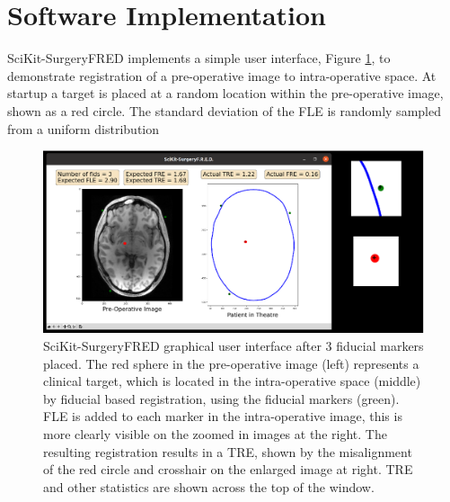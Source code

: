 \section{Software Implementation}
SciKit-SurgeryFRED implements a simple user interface, Figure \ref{fig:surgery_fred}, to demonstrate registration of a pre-operative image to intra-operative space. At startup a target is placed at a random location within the pre-operative image, shown as a red circle. The standard deviation of the \gls{FLE} is randomly sampled from a uniform distribution 

\begin{figure}
	\begin{center}
	\includegraphics[width=0.9\linewidth]{scikit-surgeryfred_gui.eps}
		\caption{\label{fig:surgery_fred}SciKit-SurgeryFRED graphical user interface after 3 fiducial markers placed. The red sphere in the pre-operative image (left) represents a clinical target, which is located in the
		intra-operative space (middle) by fiducial based registration, using the fiducial markers (green). FLE is added to each marker in the intra-operative image, this is more clearly visible on the zoomed in images at the right. The resulting registration results in a TRE, shown by the misalignment of the red circle and crosshair 
		on the enlarged image at right. TRE and other statistics are shown across the top
		of the window.}
	\end{center}
\end{figure}


